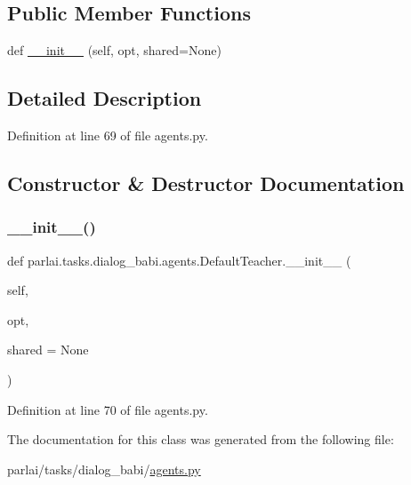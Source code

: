 \subsection*{Public Member Functions}
\begin{DoxyCompactItemize}
\item 
def \hyperlink{classparlai_1_1tasks_1_1dialog__babi_1_1agents_1_1DefaultTeacher_a973ffa6cd8da99b24a2009f79c4431c4}{\+\_\+\+\_\+init\+\_\+\+\_\+} (self, opt, shared=None)
\end{DoxyCompactItemize}


\subsection{Detailed Description}


Definition at line 69 of file agents.\+py.



\subsection{Constructor \& Destructor Documentation}
\mbox{\label{classparlai_1_1tasks_1_1dialog__babi_1_1agents_1_1DefaultTeacher_a973ffa6cd8da99b24a2009f79c4431c4}} 
\subsubsection{\texorpdfstring{\+\_\+\+\_\+init\+\_\+\+\_\+()}{\_\_init\_\_()}}
{\footnotesize\ttfamily def parlai.\+tasks.\+dialog\+\_\+babi.\+agents.\+Default\+Teacher.\+\_\+\+\_\+init\+\_\+\+\_\+ (\begin{DoxyParamCaption}\item[{}]{self,  }\item[{}]{opt,  }\item[{}]{shared = {\ttfamily None} }\end{DoxyParamCaption})}



Definition at line 70 of file agents.\+py.



The documentation for this class was generated from the following file\+:\begin{DoxyCompactItemize}
\item 
parlai/tasks/dialog\+\_\+babi/\hyperlink{parlai_2tasks_2dialog__babi_2agents_8py}{agents.\+py}\end{DoxyCompactItemize}
